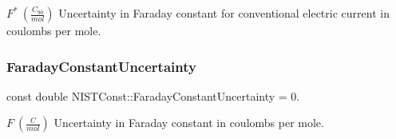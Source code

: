 $F^\ast \ (\frac{C_{90}}{mol})$ Uncertainty in Faraday constant for conventional electric current in coulombs per mole. \mbox{\label{group___faraday_constant_ga9b0f9181caac73b346e91602673272c1}} 
\subsubsection{\texorpdfstring{Faraday\+Constant\+Uncertainty}{FaradayConstantUncertainty}}
{\footnotesize\ttfamily const double N\+I\+S\+T\+Const\+::\+Faraday\+Constant\+Uncertainty = 0.}

$F \ (\frac{C}{mol})$ Uncertainty in Faraday constant in coulombs per mole. 